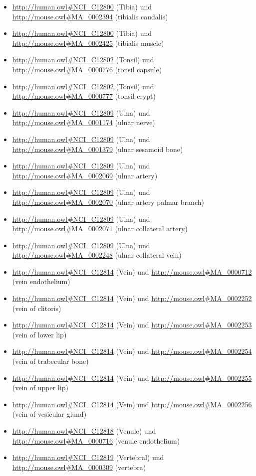 \begin{itemize}
	\item \url{http://human.owl#NCI_C12800} (Tibia) und \url{http://mouse.owl#MA_0002394} (tibialis caudalis)
	\item \url{http://human.owl#NCI_C12800} (Tibia) und \url{http://mouse.owl#MA_0002425} (tibialis muscle)
	\item \url{http://human.owl#NCI_C12802} (Tonsil) und \url{http://mouse.owl#MA_0000776} (tonsil capsule)
	\item \url{http://human.owl#NCI_C12802} (Tonsil) und \url{http://mouse.owl#MA_0000777} (tonsil crypt)
	\item \url{http://human.owl#NCI_C12809} (Ulna) und \url{http://mouse.owl#MA_0001174} (ulnar nerve)
	\item \url{http://human.owl#NCI_C12809} (Ulna) und \url{http://mouse.owl#MA_0001379} (ulnar sesamoid bone)
	\item \url{http://human.owl#NCI_C12809} (Ulna) und \url{http://mouse.owl#MA_0002069} (ulnar artery)
	\item \url{http://human.owl#NCI_C12809} (Ulna) und \url{http://mouse.owl#MA_0002070} (ulnar artery palmar branch)
	\item \url{http://human.owl#NCI_C12809} (Ulna) und \url{http://mouse.owl#MA_0002071} (ulnar collateral artery)
	\item \url{http://human.owl#NCI_C12809} (Ulna) und \url{http://mouse.owl#MA_0002248} (ulnar collateral vein)
	\item \url{http://human.owl#NCI_C12814} (Vein) und \url{http://mouse.owl#MA_0000712} (vein endothelium)
	\item \url{http://human.owl#NCI_C12814} (Vein) und \url{http://mouse.owl#MA_0002252} (vein of clitoris)
	\item \url{http://human.owl#NCI_C12814} (Vein) und \url{http://mouse.owl#MA_0002253} (vein of lower lip)
	\item \url{http://human.owl#NCI_C12814} (Vein) und \url{http://mouse.owl#MA_0002254} (vein of trabecular bone)
	\item \url{http://human.owl#NCI_C12814} (Vein) und \url{http://mouse.owl#MA_0002255} (vein of upper lip)
	\item \url{http://human.owl#NCI_C12814} (Vein) und \url{http://mouse.owl#MA_0002256} (vein of vesicular glund)
	\item \url{http://human.owl#NCI_C12818} (Venule) und \url{http://mouse.owl#MA_0000716} (venule endothelium)
	\item \url{http://human.owl#NCI_C12819} (Vertebral\textunderscoreArtery) und \url{http://mouse.owl#MA_0000309} (vertebra)

\end{itemize}
